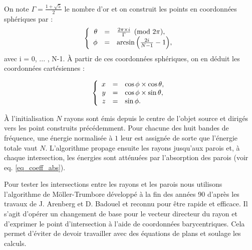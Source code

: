 On note $\Gamma = \frac{1 + \sqrt{5}}{2}$ le nombre d'or et on construit les points en coordonnées sphériques par :
\begin{equation}
  \left \{
   \begin{array}{r c l}
\theta &=& \frac{2 \pi \times i}{\Gamma}  \pmod{2\pi},  \\
\phi &=& \arcsin{\left(\frac{2i}{N-1}-1\right)}, 
   \end{array}
   \right .
\end{equation}
%
avec i = 0, ... , N-1.
%
À partir de ces coordonnées sphériques, on en déduit les coordonnées cartésiennes :

\begin{equation}
   \left \{
   \begin{array}{r c l}
x &=& \cos{\phi} \times \cos{\theta},  \\
y &=& \cos{\phi} \times \sin{\theta},  \\
z &=& \sin{\phi}.
   \end{array}
   \right .
\end{equation}


À l'initialisation $N$ rayons sont émis depuis le centre de l'objet source et dirigés vers les point construits précédemment. Pour chacune des huit bandes de fréquence, une énergie normalisée à $1$ leur est assignée de sorte que l'énergie totale vaut $N$. L'algorithme propage ensuite les rayons jusqu'aux parois et, à chaque intersection, les énergies sont atténuées par l'absorption des parois (voir eq. \ref{eq_coeff_abs}). %

Pour tester les intersections entre les rayons et les parois nous utilisons l'algorithme de Möller-Trumbore \cite[p. 2-3]{moller} développé à la fin des années 90 d'après les travaux de J. Arenberg \cite{arenberg} et D. Badouel \cite[p. 390-393]{badouel} et reconnu pour être rapide et efficace. Il s'agit d'opérer un changement de base pour le vecteur directeur du rayon et d'exprimer le point d'intersection à l'aide de coordonnées barycentriques. Cela permet d'éviter de devoir travailler avec des équations de plans et soulage les calculs.

